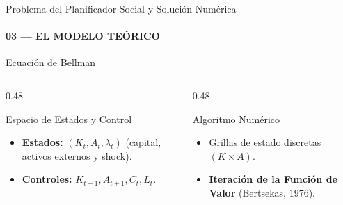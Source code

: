 \documentclass[aspectratio=169, 10pt]{beamer}
\begin{document}
\begin{frame}{Problema del Planificador Social y Solución Numérica}
    \framesubtitle{03 --- EL MODELO TEÓRICO}

    \begin{block}{Ecuación de Bellman}
        \footnotesize
    \end{block}
    \vspace{0.15cm}
    \begin{columns}[T]
        \begin{column}{0.48\textwidth}
            \begin{exampleblock}{Espacio de Estados y Control}
                \scriptsize
                \begin{itemize}
                    \item \textbf{Estados:} $(K_t, A_t, \lambda_t)$ (capital, activos externos y shock).
                    \item \textbf{Controles:} $K_{t+1}, A_{t+1}, C_t, L_t$.
                \end{itemize}
            \end{exampleblock}
        \end{column}
        \begin{column}{0.48\textwidth}
            \begin{exampleblock}{Algoritmo Numérico}
                \scriptsize
                \begin{itemize}
                    \item Grillas de estado discretas $(K \times A)$.
                    \item \textbf{Iteración de la Función de Valor} (Bertsekas, 1976).
                \end{itemize}
            \end{exampleblock}
        \end{column}
    \end{columns}
\end{frame}
\end{document}
